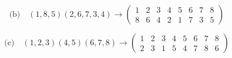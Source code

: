 \documentclass[12pt]{article}
\begin{document}
\begin{enumerate}[start=1,label={\bfseries Question \arabic*:},leftmargin=1in]
  \[
  \text{(b)} \quad (1, 8, 5)(2, 6, 7, 3, 4) \rightarrow
  \begin{pmatrix}
  1 & 2 & 3 & 4 & 5 & 6 & 7 & 8 \\
  8 & 6 & 4 & 2 & 1 & 7 & 3 & 5
  \end{pmatrix}
  \]

  \[
  \text{(c)} \quad (1, 2, 3)(4, 5)(6, 7, 8) \rightarrow
  \begin{pmatrix}
  1 & 2 & 3 & 4 & 5 & 6 & 7 & 8 \\
  2 & 3 & 1 & 5 & 4 & 7 & 8 & 6
  \end{pmatrix}
  \]
\end{enumerate}
\end{document}
